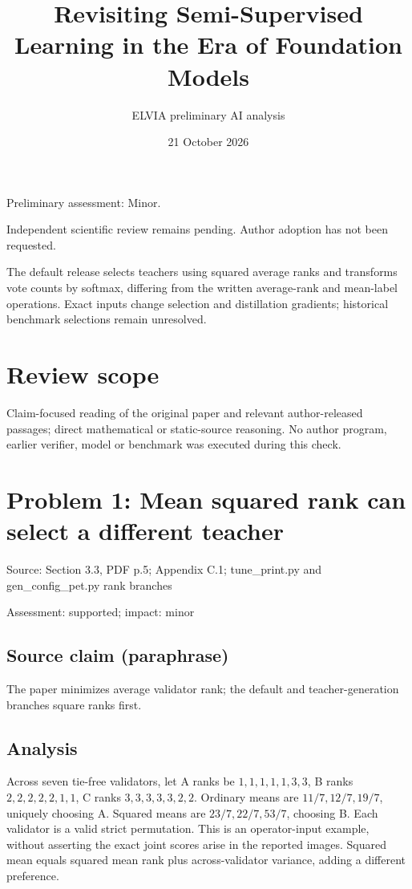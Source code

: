 \documentclass[11pt]{article}
\begin{document}
\title{Revisiting Semi-Supervised Learning in the Era of Foundation Models}

\author{ELVIA preliminary AI analysis}\date{21 October 2026}\maketitle

Preliminary assessment: Minor.\par

Independent scientific review remains pending. Author adoption has not been requested.

The default release selects teachers using squared average ranks and transforms vote counts by softmax, differing from the written average-rank and mean-label operations. Exact inputs change selection and distillation gradients; historical benchmark selections remain unresolved.

\section*{Review scope}

Claim-focused reading of the original paper and relevant author-released passages; direct mathematical or static-source reasoning. No author program, earlier verifier, model or benchmark was executed during this check.

\section*{Problem 1: Mean squared rank can select a different teacher}

Source: Section 3.3, PDF p.5; Appendix C.1; tune\_print.py and gen\_config\_pet.py rank branches

Assessment: supported; impact: minor

\subsection*{Source claim (paraphrase)}

The paper minimizes average validator rank; the default and teacher-generation branches square ranks first.

\subsection*{Analysis}

Across seven tie-free validators, let A ranks be \(1,1,1,1,1,3,3\), B ranks \(2,2,2,2,2,1,1\), C ranks \(3,3,3,3,3,2,2\). Ordinary means are \(11/7,12/7,19/7\), uniquely choosing A. Squared means are \(23/7,22/7,53/7\), choosing B. Each validator is a valid strict permutation. This is an operator-input example, without asserting the exact joint scores arise in the reported images. Squared mean equals squared mean rank plus across-validator variance, adding a different preference.
\end{document}
